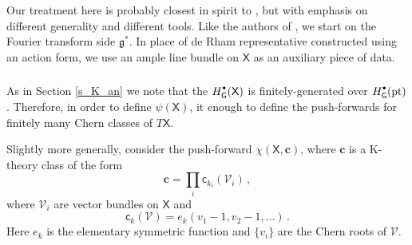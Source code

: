 \documentclass[14pt]{extarticle}
\newcommand{\bG}{\mathsf{G}}
\newcommand{\bX}{\mathsf{X}}
\newcommand{\cV}{\mathscr{V}}
\newcommand{\bc}{\mathsf{c}}
\newcommand{\bbc}{\mathbf{c}}
\newcommand{\fg}{\mathfrak{g}}
\newcommand{\Hd}{{H}^{\raisebox{0.5mm}{$\scriptscriptstyle \bullet$}}}
\DeclareMathOperator{\pt}{pt}
\theoremstyle{definition}
\begin{document}
Our treatment here is probably closest in spirit to \cite{CPV}, but
with emphasis on different generality and different tools. Like the
authors of  \cite{CPV}, 
we start on the Fourier transform side $\fg^*$. In place of de Rham
representative constructed using an action form,
we use an ample line bundle on $\bX$ as an auxiliary piece of data. 

\subsubsection{} 
As in Section \ref{s_K_an} we note that
the $\Hd_\bG(\bX)$ is finitely-generated over $\Hd_\bG(\pt)$. 
Therefore, in order to define $\psi(\bX)$,  it enough to define the push-forwards for
finitely many Chern classes of $T \bX$.

Slightly more generally, consider the push-forward
$\chi(\bX, \bbc)$, where $\bbc$ is a K-theory class of the form 
%
\begin{equation}
\bbc = \prod_i \bc_{k_i} (\cV_i)\,, \label{eq:166}
\end{equation}
%
where $\cV_i$ are vector bundles on $\bX$ and
\[
  \bc_k(\cV) = e_k(v_1-1,v_2-1,\dots) \,. 
\]
Here $e_k$ is the elementary symmetric function and $\{v_i\}$ are the
Chern roots of $\cV$. 


\subsubsection{}
\end{document}
